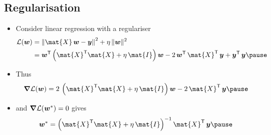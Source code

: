 
\begin{slide}
\section{Regularisation}

\begin{PauseHighLight}
  \begin{itemize}
  \item Consider linear regression with a regulariser
    \begin{align*}
      \mathcal{L}(\bm{w})
      &=  \left\| \mat{X}\,\bm{w} - \bm{y} \right\|^2 + \eta \, \|\bm{w}\|^2
      \\
      &= \bm{w}^\tr \left(\mat{X}^\tr \mat{X} + \eta \, \mat{I}
        \right) \bm{w}  - 2 \, \bm{w}^\tr \, \mat{X}^\tr \, \bm{y} +
        \bm{y}^\tr\,\bm{y} \pause
    \end{align*}
  \item Thus
    \begin{align*}
      \grad \mathcal{L}(\bm{w}) = 2 \,
      \left(\mat{X}^\tr \mat{X} + \eta \, \mat{I} \right) \bm{w}
      - 2 \, \mat{X}^\tr \, \bm{y}\pause
    \end{align*}
  \item and $\bm{\nabla} \mathcal{L}(\bm{w}^*)=0$ gives
    \begin{align*}
      \bm{w}^* = \left(\mat{X}^\tr \mat{X} + \eta \, \mat{I}
      \right)^{-1} \mat{X}^\tr \, \bm{y}\pause
    \end{align*}
  \end{itemize}
\end{PauseHighLight}

\end{slide}



